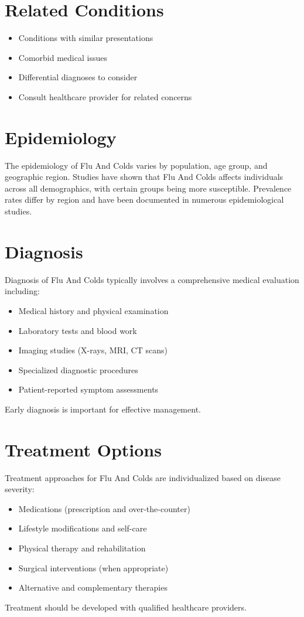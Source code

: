 \section*{Related Conditions}
\begin{itemize}
  \item Conditions with similar presentations
  \item Comorbid medical issues
  \item Differential diagnoses to consider
  \item Consult healthcare provider for related concerns
\end{itemize}

\section*{Epidemiology}
The epidemiology of Flu And Colds varies by population, age group, and geographic region. Studies have shown that Flu And Colds affects individuals across all demographics, with certain groups being more susceptible. Prevalence rates differ by region and have been documented in numerous epidemiological studies.

\section*{Diagnosis}
Diagnosis of Flu And Colds typically involves a comprehensive medical evaluation including:
\begin{itemize}
  \item Medical history and physical examination
  \item Laboratory tests and blood work
  \item Imaging studies (X-rays, MRI, CT scans)
  \item Specialized diagnostic procedures
  \item Patient-reported symptom assessments
\end{itemize}
Early diagnosis is important for effective management.

\section*{Treatment Options}
Treatment approaches for Flu And Colds are individualized based on disease severity:
\begin{itemize}
  \item Medications (prescription and over-the-counter)
  \item Lifestyle modifications and self-care
  \item Physical therapy and rehabilitation
  \item Surgical interventions (when appropriate)
  \item Alternative and complementary therapies
\end{itemize}
Treatment should be developed with qualified healthcare providers.

